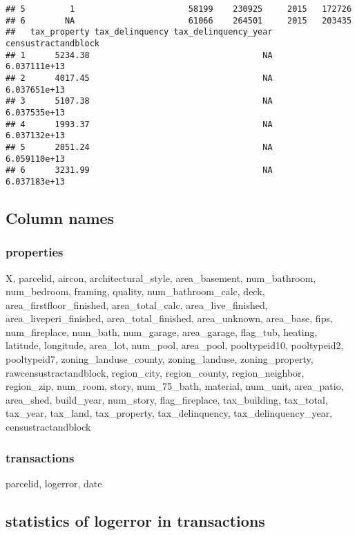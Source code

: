 \documentclass[
]{article}
\begin{document}
\begin{verbatim}
## 5         1                       58199    230925     2015   172726
## 6        NA                       61066    264501     2015   203435
##   tax_property tax_delinquency tax_delinquency_year censustractandblock
## 1      5234.38                                   NA        6.037111e+13
## 2      4017.45                                   NA        6.037651e+13
## 3      5107.38                                   NA        6.037535e+13
## 4      1993.37                                   NA        6.037132e+13
## 5      2851.24                                   NA        6.059110e+13
## 6      3231.99                                   NA        6.037183e+13
\end{verbatim}

\hypertarget{column-names}{%
\subsection{Column names}\label{column-names}}

\hypertarget{properties}{%
\subsubsection{properties}\label{properties}}

X, parcelid, aircon, architectural\_style, area\_basement,
num\_bathroom, num\_bedroom, framing, quality, num\_bathroom\_calc,
deck, area\_firstfloor\_finished, area\_total\_calc,
area\_live\_finished, area\_liveperi\_finished, area\_total\_finished,
area\_unknown, area\_base, fips, num\_fireplace, num\_bath, num\_garage,
area\_garage, flag\_tub, heating, latitude, longitude, area\_lot,
num\_pool, area\_pool, pooltypeid10, pooltypeid2, pooltypeid7,
zoning\_landuse\_county, zoning\_landuse, zoning\_property,
rawcensustractandblock, region\_city, region\_county, region\_neighbor,
region\_zip, num\_room, story, num\_75\_bath, material, num\_unit,
area\_patio, area\_shed, build\_year, num\_story, flag\_fireplace,
tax\_building, tax\_total, tax\_year, tax\_land, tax\_property,
tax\_delinquency, tax\_delinquency\_year, censustractandblock

\hypertarget{transactions}{%
\subsubsection{transactions}\label{transactions}}

parcelid, logerror, date

\hypertarget{statistics-of-logerror-in-transactions}{%
\subsection{statistics of logerror in
transactions}\label{statistics-of-logerror-in-transactions}}
\end{document}
